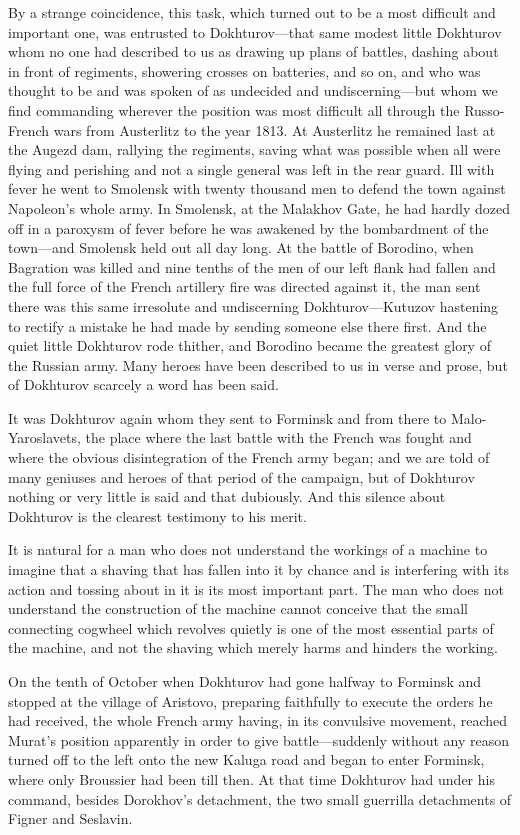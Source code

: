 By a strange coincidence, this task, which turned out to be a
most difficult and important one, was entrusted to
Dokhturov---that same modest little Dokhturov whom no one had
described to us as drawing up plans of battles, dashing about in
front of regiments, showering crosses on batteries, and so on,
and who was thought to be and was spoken of as undecided and
undiscerning---but whom we find commanding wherever the position
was most difficult all through the Russo-French wars from
Austerlitz to the year 1813. At Austerlitz he remained last at
the Augezd dam, rallying the regiments, saving what was possible
when all were flying and perishing and not a single general was
left in the rear guard. Ill with fever he went to Smolensk with
twenty thousand men to defend the town against Napoleon's whole
army. In Smolensk, at the Malakhov Gate, he had hardly dozed off
in a paroxysm of fever before he was awakened by the bombardment
of the town---and Smolensk held out all day long. At the battle
of Borodino, when Bagration was killed and nine tenths of the men
of our left flank had fallen and the full force of the French
artillery fire was directed against it, the man sent there was
this same irresolute and undiscerning Dokhturov---Kutuzov
hastening to rectify a mistake he had made by sending someone
else there first. And the quiet little Dokhturov rode thither,
and Borodino became the greatest glory of the Russian army. Many
heroes have been described to us in verse and prose, but of
Dokhturov scarcely a word has been said.

It was Dokhturov again whom they sent to Forminsk and from there
to Malo-Yaroslavets, the place where the last battle with the
French was fought and where the obvious disintegration of the
French army began; and we are told of many geniuses and heroes of
that period of the campaign, but of Dokhturov nothing or very
little is said and that dubiously. And this silence about
Dokhturov is the clearest testimony to his merit.

It is natural for a man who does not understand the workings of a
machine to imagine that a shaving that has fallen into it by
chance and is interfering with its action and tossing about in it
is its most important part. The man who does not understand the
construction of the machine cannot conceive that the small
connecting cogwheel which revolves quietly is one of the most
essential parts of the machine, and not the shaving which merely
harms and hinders the working.

On the tenth of October when Dokhturov had gone halfway to
Forminsk and stopped at the village of Aristovo, preparing
faithfully to execute the orders he had received, the whole
French army having, in its convulsive movement, reached Murat's
position apparently in order to give battle---suddenly without
any reason turned off to the left onto the new Kaluga road and
began to enter Forminsk, where only Broussier had been till
then. At that time Dokhturov had under his command, besides
Dorokhov's detachment, the two small guerrilla detachments of
Figner and Seslavin.

